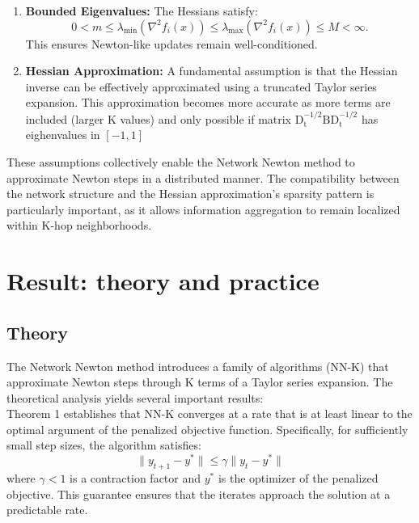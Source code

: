 \documentclass[10pt,english]{article}
\begin{document}
\begin{enumerate}
    \item \textbf{Bounded Eigenvalues:}  
    The Hessians satisfy:
    \begin{equation}
        0 < m \leq \lambda_{\min}(\nabla^2 f_i(x)) \leq \lambda_{\max}(\nabla^2 f_i(x)) \leq M < \infty.
    \end{equation}
    This ensures Newton-like updates remain well-conditioned.

    \item \textbf{Hessian Approximation:}
    A fundamental assumption is that the Hessian inverse can be effectively approximated using a truncated Taylor series expansion. This approximation becomes more accurate as more terms are included (larger K values) and only possible if matrix $\mathrm{D_t^{-1/2}BD_t^{-1/2}}$ has eighenvalues in $[-1,1]$
    

\end{enumerate}

These assumptions collectively enable the Network Newton method to approximate Newton steps in a distributed manner. The compatibility between the network structure and the Hessian approximation's sparsity pattern is particularly important, as it allows information aggregation to remain localized within K-hop neighborhoods.

\section{Result: theory and practice}

\subsection{Theory}

The Network Newton method introduces a family of algorithms (NN-K) that approximate Newton steps through K terms of a Taylor series expansion. The theoretical analysis yields several important results:\\

Theorem 1 establishes that NN-K converges at a rate that is at least linear to the optimal argument of the penalized objective function. Specifically, for sufficiently small step sizes, the algorithm satisfies:
\begin{equation}
    \|y_{t+1} - y^*\| \leq \gamma\|y_t - y^*\|
\end{equation}
where $\gamma < 1$ is a contraction factor and $y^*$ is the optimizer of the penalized objective. This guarantee ensures that the iterates approach the solution at a predictable rate.\\
\end{document}
